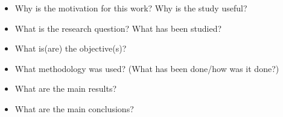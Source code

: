 \lipsum[1-2]
\begin{itemize}
\item Why is the motivation for this work? Why is the study useful?
\item What is the research question? What has been studied?
\item What is(are) the objective(s)?
\item What methodology was used? (What has been done/how was it done?)
\item What are the main results?
\item What are the main conclusions?
\end{itemize}

